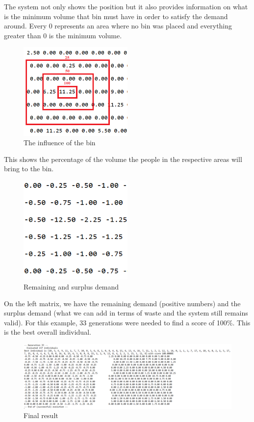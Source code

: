 \documentclass[a4paper,12pt]{report}
\begin{document}
The system not only shows the position but it also provides information on what is the minimum volume that bin must have in order to satisfy the demand around. Every 0 represents an area where no bin was placed and everything greater than 0 is the minimum volume.

\begin{figure}[H]
    \centering
    \includegraphics[width=0.5\textwidth]{fig/influence1}
    \caption{The influence of the bin}
    \label{fig:influence1}
\end{figure}

This shows the percentage of the volume the people in the respective areas will bring to the bin.

\begin{figure}[H]
    \centering
    \includegraphics[width=0.5\textwidth]{fig/remaining}
    \caption{Remaining and surplus demand}
    \label{fig:remaining}
\end{figure}
On the left matrix, we have the remaining demand (positive numbers) and the surplus demand (what we can add in terms of waste and the system still remains valid).
For this example, 33 generations were needed to find a score of 100\%. This is the best overall individual.
\begin{figure}[H]
    \centering
    \includegraphics[width=1\textwidth]{fig/results3}
    \caption{Final result}
    \label{fig:results3}
\end{figure}
\end{document}
